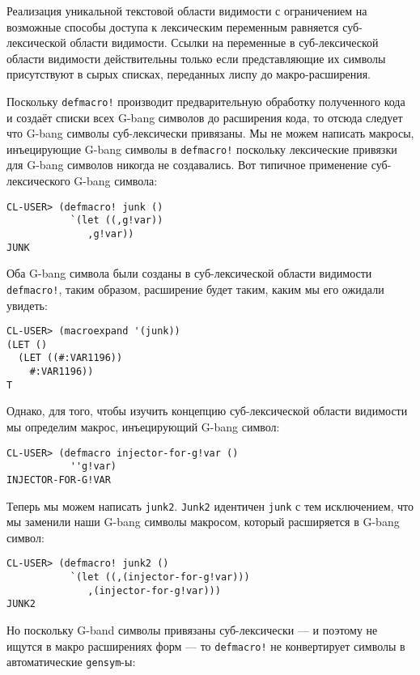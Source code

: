 Реализация уникальной текстовой области видимости с ограничением на возможные способы доступа к лексическим переменным равняется суб-лексической области видимости. Ссылки на переменные в суб-лексической области видимости действительны только если представляющие их символы присутствуют в сырых списках, переданных лиспу до макро-расширения.

Поскольку \verb"defmacro!" производит предварительную обработку полученного кода и создаёт списки всех G-bang символов до расширения кода, то отсюда следует что G-bang символы суб-лексически привязаны. Мы не можем написать макросы, инъецирующие G-bang символы в \verb"defmacro!" поскольку лексические привязки для G-bang символов никогда не создавались. Вот типичное применение суб-лексического G-bang символа:

\begin{verbatim}
CL-USER> (defmacro! junk ()
           `(let ((,g!var))
              ,g!var))
JUNK
\end{verbatim}

Оба G-bang символа были созданы в суб-лексической области видимости \verb"defmacro!", таким образом, расширение будет таким, каким мы его ожидали увидеть:

\begin{verbatim}
CL-USER> (macroexpand '(junk))
(LET ()
  (LET ((#:VAR1196))
    #:VAR1196))
T
\end{verbatim}

Однако, для того, чтобы изучить концепцию суб-лексической области видимости мы определим макрос, инъецирующий G-bang символ:

\begin{verbatim}
CL-USER> (defmacro injector-for-g!var ()
           ''g!var)
INJECTOR-FOR-G!VAR
\end{verbatim}

Теперь мы можем написать \verb"junk2". \verb"Junk2" идентичен \verb"junk" с тем исключением, что мы заменили наши G-bang символы макросом, который расширяется в G-bang символ:

\begin{verbatim}
CL-USER> (defmacro! junk2 ()
           `(let ((,(injector-for-g!var)))
              ,(injector-for-g!var)))
JUNK2
\end{verbatim}

Но поскольку G-band символы привязаны суб-лексически --- и поэтому не ищутся в макро расширениях форм --- то \verb"defmacro!" не конвертирует символы в автоматические \verb"gensym"-ы:

